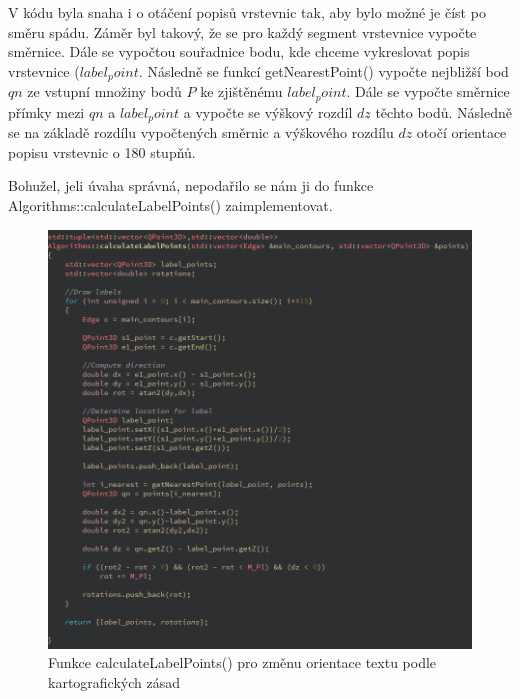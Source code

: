 \documentclass[11pt]{article}
\begin{document}
V kódu byla snaha i o otáčení popisů vrstevnic tak, aby bylo možné je číst po směru spádu. Záměr byl takový, že se pro každý segment vrstevnice vypočte směrnice. Dále se vypočtou souřadnice bodu, kde chceme vykreslovat popis vrstevnice ($label_point$. Následně se funkcí getNearestPoint() vypočte nejbližší bod $qn$ ze vstupní množiny bodů $P$ ke zjištěnému $label_point$. Dále se vypočte směrnice přímky mezi $qn$ a $label_point$ a vypočte se výškový rozdíl $dz$ těchto bodů.
Následně se na základě rozdílu vypočtených směrnic a výškového rozdílu $dz$ otočí orientace  popisu vrstevnic o 180 stupňů.

Bohužel, jeli úvaha správná, nepodařilo se nám ji do funkce Algorithms::calculateLabelPoints() zaimplementovat.

\begin{figure}[htbh]
	\centering
	\captionsetup{justification=centering}
	\includegraphics[scale=0.5]{images/code_calculateLabelPoints.png} 
	\caption{Funkce calculateLabelPoints() pro změnu orientace textu podle kartografických zásad}
	\label{fig:code_calculateLabelPoints}
\end{figure}

\clearpage

\end{document}

